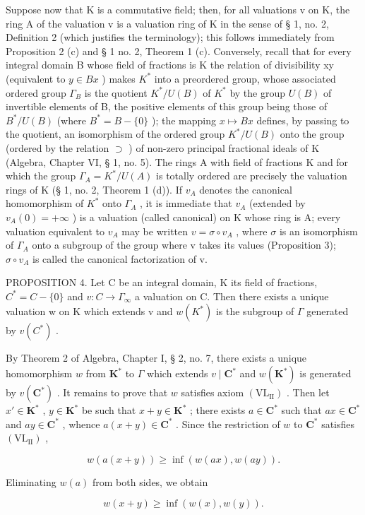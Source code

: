 Suppose now that K is a commutative field; then, for all valuations v on K, the ring A of the valuation v is a valuation ring of K in the sense of § 1, no. 2, Definition 2 (which justifies the terminology); this follows immediately from Proposition 2 (c) and § 1 no. 2, Theorem 1 (c). Conversely, recall that for every integral domain B whose field of fractions is K the relation of divisibility x\textbar y (equivalent to \(y \in Bx\) ) makes \(K^{*}\) into a preordered group, whose associated ordered group \(\Gamma_{B}\) is the quotient \(K^{*}/U(B)\) of \(K^{*}\) by the group \(U(B)\) of invertible elements of B, the positive elements of this group being those of \(B^{*}/U(B)\) (where \(B^{*} = B - \{0\}\) ); the mapping \(x \mapsto Bx\) defines, by passing to the quotient, an isomorphism of the ordered group \(K^{*}/U(B)\) onto the group (ordered by the relation \(\supset\) ) of non-zero principal fractional ideals of K (Algebra, Chapter VI, § 1, no. 5). The rings A with field of fractions K and for which the group \(\Gamma_{A} = K^{*}/U(A)\) is totally ordered are precisely the valuation rings of K (§ 1, no. 2, Theorem 1 (d)). If \(v_{A}\) denotes the canonical homomorphism of \(K^{*}\) onto \(\Gamma_{A}\) , it is immediate that \(v_{A}\) (extended by \(v_{A}(0) = +\infty\) ) is a valuation (called canonical) on K whose ring is A; every valuation equivalent to \(v_{A}\) may be written \(v = \sigma \circ v_{A}\) , where \(\sigma\) is an isomorphism of \(\Gamma_{A}\) onto a subgroup of the group where v takes its values (Proposition 3); \(\sigma \circ v_{A}\) is called the canonical factorization of v.

PROPOSITION 4. Let C be an integral domain, K its field of fractions, \(C^{*} = C - \{0\}\) and \(v: C \to \Gamma_{\infty}\) a valuation on C. Then there exists a unique valuation w on K which extends v and \(w(K^{*})\) is the subgroup of \(\Gamma\) generated by \(v(C^{*})\) .

By Theorem 2 of Algebra, Chapter I, § 2, no. 7, there exists a unique homomorphism \(w\) from \(\mathbf{K}^*\) to \(\Gamma\) which extends \(v \mid \mathbf{C}^*\) and \(w(\mathbf{K}^*)\) is generated by \(v(\mathbf{C}^*)\) . It remains to prove that \(w\) satisfies axiom \((\mathrm{VL}_{\mathrm{II}})\) . Then let \(x' \in \mathbf{K}^*\) , \(y \in \mathbf{K}^*\) be such that \(x + y \in \mathbf{K}^*\) ; there exists \(a \in \mathbf{C}^*\) such that \(ax \in \mathbf{C}^*\) and \(ay \in \mathbf{C}^*\) , whence \(a(x + y) \in \mathbf{C}^*\) . Since the restriction of \(w\) to \(\mathbf{C}^*\) satisfies \((\mathrm{VL}_{\mathrm{II}})\) ,

\[
w (a (x + y)) \geqslant \inf (w (a x), w (a y)).
\]

Eliminating \(w(a)\) from both sides, we obtain

\[
w (x + y) \geqslant \inf (w (x), w (y)).
\]

